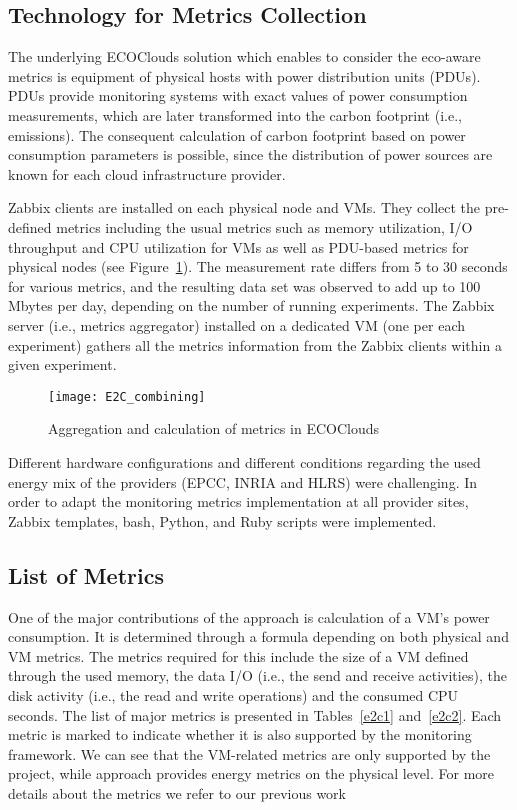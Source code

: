 \documentclass[10pt,letterpaper]{IEEEtran}
\begin{document}
\subsection{\ECO Technology for Metrics Collection}

The underlying ECOClouds solution which enables to consider the eco-aware metrics
is equipment of physical hosts with power distribution units (PDUs).
PDUs provide monitoring systems with exact values of power consumption measurements,
which are later transformed into the carbon footprint (i.e.,  emissions).
The consequent calculation of carbon footprint based on power consumption parameters is possible, since
the distribution of power sources are known for each cloud infrastructure provider.

Zabbix clients are installed on each physical node and VMs. They collect the pre-defined metrics
including the usual metrics such as memory utilization, I/O throughput and CPU utilization for VMs
as well as PDU-based metrics for physical nodes (see Figure~\ref{fig:E2C_combining}).
The measurement rate differs from 5 to 30 seconds for various metrics, and
the resulting data set was observed to add up to 100 Mbytes per day, depending on the number of running experiments.
The Zabbix server (i.e., metrics aggregator) installed on a dedicated VM (one per each experiment) gathers all
the metrics information from the Zabbix clients within a given experiment.

\begin{figure}
  \begin{center}
    \texttt{[image: E2C\_combining]}
    \caption{Aggregation and calculation of metrics in ECOClouds \cite{TenschertSG14}}
    \label{fig:E2C_combining}
  \end{center}
\end{figure}

Different hardware configurations and different conditions regarding the used energy
mix of the providers (EPCC, INRIA and HLRS) were challenging.
In order to adapt the monitoring metrics implementation at all provider sites,
Zabbix templates, bash, Python, and Ruby scripts were implemented. 

\subsection{List of \ECO Metrics}

One of the major contributions of the \ECO approach is calculation of a VM's power consumption.
It is determined through a formula depending on both physical and VM metrics. The metrics required 
for this include the size of a VM defined through the used memory, the data I/O (i.e., the send and receive activities), the disk activity
(i.e., the read and write operations) and the consumed CPU seconds.
The list of major \ECO metrics is presented in Tables~\ref{e2c1} and~\ref{e2c2}. Each metric is marked to
indicate whether it is also supported by the \EXCESS monitoring framework.
We can see that the VM-related metrics are only supported by the \ECO project,
while \EXCESS approach provides energy metrics on the physical level.
For more details about the \ECO metrics we refer to our previous work~\cite{Wajid2015}
\end{document}
